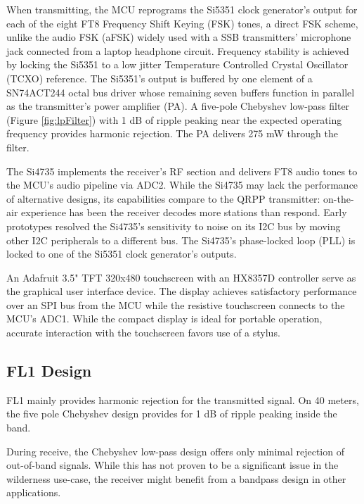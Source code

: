 \documentclass[12pt, letterpaper]{article}
\begin{document}
When transmitting, the MCU reprograms the Si5351 clock generator's output for each of the eight FT8 Frequency Shift Keying (FSK) tones, a direct FSK scheme, unlike the audio FSK (aFSK) widely used with a SSB transmitters' microphone jack connected from a laptop headphone circuit.
Frequency stability is achieved by locking the Si5351 to a low jitter Temperature Controlled Crystal Oscillator (TCXO) reference.
The Si5351's output is buffered by one element of a SN74ACT244 octal bus driver whose remaining seven buffers function in parallel as the transmitter's power amplifier (PA).
A five-pole Chebyshev low-pass filter (Figure \ref{fig:lpFilter}) with 1 dB of ripple peaking near the expected operating frequency  provides harmonic rejection.
The PA delivers 275 mW through the filter.

The Si4735 implements the receiver's RF section and delivers FT8 audio tones to the MCU's audio pipeline via ADC2.
While the Si4735 may lack the performance of alternative designs, its capabilities compare to the QRPP transmitter:  on-the-air experience has been the receiver decodes more stations than respond.
Early prototypes resolved the Si4735's sensitivity to noise on its I2C bus by moving other I2C peripherals to a different bus.
The Si4735's phase-locked loop (PLL) is locked to one of the Si5351 clock generator's outputs.

An Adafruit 3.5" TFT 320x480 touchscreen with an HX8357D controller serve as the graphical user interface device.
The display achieves satisfactory performance over an SPI bus from the MCU while the resistive touchscreen connects to the MCU's ADC1.
While the compact display is ideal for portable operation, accurate interaction with the touchscreen favors use of a stylus.








 
 \subsection*{FL1 Design}
FL1 mainly provides harmonic rejection for the transmitted signal.
On 40 meters, the five pole Chebyshev design provides for 1 dB of ripple peaking inside the band.

During receive, the Chebyshev low-pass design offers only minimal rejection of out-of-band signals. 
While this has not proven to be a significant issue in the wilderness use-case, the receiver might benefit from a bandpass design in other applications.
\end{document}
